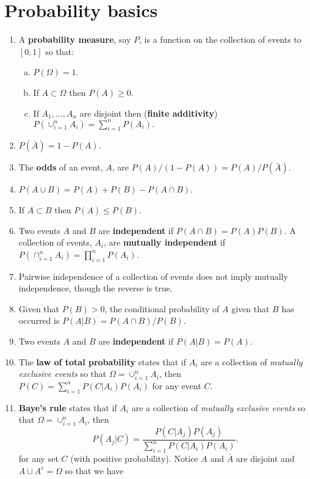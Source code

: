 \documentclass[12pt]{article}
\begin{document}
\section{Probability basics}
\begin{enumerate}[1.]
  \item A {\bf probability measure}, say $P$, is a function on the
    collection of events to $[0,1]$ so that:
    \begin{enumerate}[a.]
    \item $P(\Omega) = 1$.
    \item If $A\subset \Omega$ then $P(A) \geq 0$.
    \item If $A_1,\ldots, A_n$ are disjoint then ({\bf finite additivity})
      $
      P(\cup_{i=1}^n A_i) = \sum_{i=1}^n P(A_i).
      $
    \end{enumerate}
  \item $P(\bar A) = 1 - P(A)$.
  \item The {\bf odds} of an event, $A$, are $P(A) / (1 - P(A)) = P(A) / P(\bar A)$.
  \item $P(A \cup B) = P(A) + P(B) - P(A\cap B)$.
  \item If $A \subset B$ then $P(A) \leq P(B)$.
  \item Two events $A$ and $B$ are {\bf independent} if $P(A\cap B) = P(A) P(B)$. A collection of 
    events, $A_i$, are {\bf mutually independent} if $P(\cap_{i=1}^n A_i) = \prod_{i=1}^n P(A_i)$.
  \item Pairwise independence of a collection of events does not imply
    mutually independence, though the reverse is true.
  \item Given that $P(B) > 0$, the conditional probability of $A$ given that $B$ has occurred is
    $P(A | B) = P(A \cap B) / P(B)$.
  \item Two events $A$ and $B$ are {\bf independent} if $P(A | B) = P(A)$.
  \item The {\bf law of total probability} states that if $A_i$ are a
    collection of {\em mutually exclusive events} so that $\Omega = \cup_{i=1}^n A_i$,
    then $P(C) = \sum_{i=1}^n P(C | A_i)P(A_i)$ for any event $C$.
  \item {\bf Baye's rule} states that if $A_i$ are a collection of
    {\em mutually exclusive events} so that $\Omega = \cup_{i=1}^n
    A_i$, then
    $$
    P(A_j | C) = \frac{P(C | A_j) P(A_j)}{\sum_{i=1}^n P(C|A_i)P(A_i)}.
    $$
    for any set $C$ (with positive probability). Notice $A$ and
    $\bar A$ are disjoint and $A\cup A^c = \Omega$ so that we have

\end{enumerate}
\end{document}
